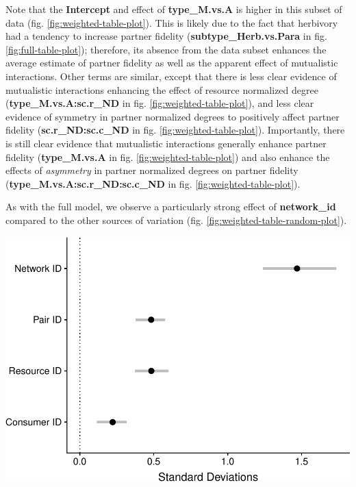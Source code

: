 \documentclass[11pt,]{article}
\let\origfigure\figure
\let\endorigfigure\endfigure
\renewenvironment{figure}[1][2] {
    \expandafter\origfigure\expandafter[H]
} {
    \endorigfigure
}
\begin{document}
Note that the \textbf{Intercept} and effect of \textbf{type\_M.vs.A} is
higher in this subset of data (fig. \ref{fig:weighted-table-plot}). This
is likely due to the fact that herbivory had a tendency to increase
partner fidelity (\textbf{subtype\_Herb.vs.Para} in fig.
\ref{fig:full-table-plot}); therefore, its absence from the data subset
enhances the average estimate of partner fidelity as well as the
apparent effect of mutualistic interactions. Other terms are similar,
except that there is less clear evidence of mutualistic interactions
enhancing the effect of resource normalized degree
(\textbf{type\_M.vs.A:sc.r\_ND} in fig. \ref{fig:weighted-table-plot}),
and less clear evidence of symmetry in partner normalized degrees to
positively affect partner fidelity (\textbf{sc.r\_ND:sc.c\_ND} in fig.
\ref{fig:weighted-table-plot}). Importantly, there is still clear
evidence that mutualistic interactions generally enhance partner
fidelity (\textbf{type\_M.vs.A} in fig. \ref{fig:weighted-table-plot})
and also enhance the effects of \emph{asymmetry} in partner normalized
degrees on partner fidelity (\textbf{type\_M.vs.A:sc.r\_ND:sc.c\_ND} in
fig. \ref{fig:weighted-table-plot}).

As with the full model, we observe a particularly strong effect of
\textbf{network\_id} compared to the other sources of variation (fig.
\ref{fig:weighted-table-random-plot}).

\begin{figure}

{\centering \includegraphics[width=0.75\linewidth]{reproduce_analyses_files/figure-latex/weighted-table-random-plot-1} 

}

\caption{Mean and 95\% credible intervals of random effects from our weighted subset model.}\label{fig:weighted-table-random-plot}
\end{figure}
\end{document}
